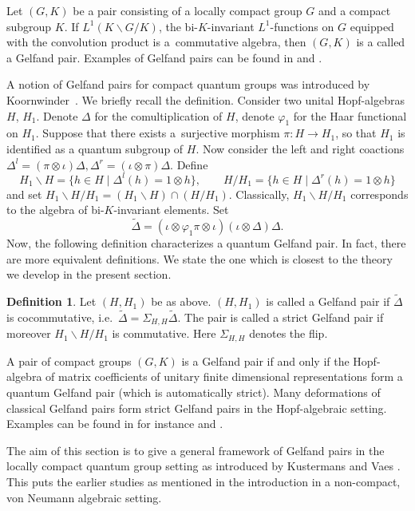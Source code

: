 \documentclass[11pt]{article}
\numberwithin{equation}{section}
\theoremstyle{definition}
\newtheorem{dfn}[thm]{Definition}
\begin{document}
Let $(G, K)$ be a pair consisting of a locally compact group $G$ and a compact subgroup $K$. If $L^1(K \backslash G \slash K)$, the bi-$K$-invariant $L^1$-functions on $G$ equipped with the convolution product is a~commutative algebra, then $(G,K)$ is a called a Gelfand pair. Examples of Gelfand pairs can be found in \cite[Chapter~7]{Dij} and \cite{Far}.

A notion of Gelfand pairs for compact quantum groups was introduced by Koornwinder~\cite{Koo}. We brief\/ly recall the def\/inition. Consider two unital Hopf-algebras $H$, $H_1$. Denote $\Delta$ for the comultiplication of $H$, denote $\varphi_1$ for the Haar functional on $H_1$. Suppose that there exists a~surjective morphism $\pi: H \rightarrow H_1$, so that $H_1$ is identif\/ied as a quantum subgroup of $H$. Now consider the left and right coactions
$
\Delta^l = (\pi \otimes \iota) \Delta,  \Delta^r = (\iota \otimes \pi) \Delta.
$
 Def\/ine
\[
H_1 \backslash H   = \big\{ h \in H \mid \Delta^l(h) = 1 \otimes h\big\}, \qquad  H \slash H_1   = \big\{ h \in H \mid \Delta^r(h) = 1 \otimes h\big\}
\]
 and set $H_1 \backslash H  \slash H_1 = (H_1 \backslash H)  \cap (H  \slash H_1)$. Classically, $H_1 \backslash H  \slash H_1$ corresponds to the algebra of bi-$K$-invariant elements. Set
\[
\tilde{\Delta}  = (\iota \otimes \varphi_1 \pi \otimes \iota)(\iota \otimes \Delta) \Delta.
\]
Now, the following def\/inition characterizes a quantum Gelfand pair. In fact, there are more equivalent def\/initions. We state the one which is closest to the theory we develop in the present section.
\begin{dfn}
Let $(H, H_1)$ be as above. $(H, H_1)$ is called a Gelfand pair if $\tilde{\Delta}$ is cocommutative, i.e.\ $\tilde{\Delta} = \Sigma_{H, H} \tilde{\Delta}$. The pair is called a strict Gelfand pair if moreover $H_1 \backslash H  \slash H_1$ is commutative. Here $\Sigma_{H, H}$ denotes the f\/lip.
\end{dfn}

A pair of compact groups $(G, K)$ is a Gelfand pair if and only if the Hopf-algebra of matrix coef\/f\/icients of unitary f\/inite dimensional representations form a quantum Gelfand pair (which is automatically strict).  Many deformations of classical Gelfand pairs form   strict Gelfand pairs in the Hopf-algebraic setting. Examples  can be found in for instance \cite{Flo, KoeAsk, NouYamMim, VaiGel} and \cite{VaiHyp}.

The aim of this section is to give a general framework of Gelfand pairs in the locally compact quantum group setting as introduced by Kustermans and Vaes \cite{KusVae, KusVaeII}. This puts the earlier studies as mentioned in the introduction in a non-compact, von Neumann algebraic setting.
\end{document}
